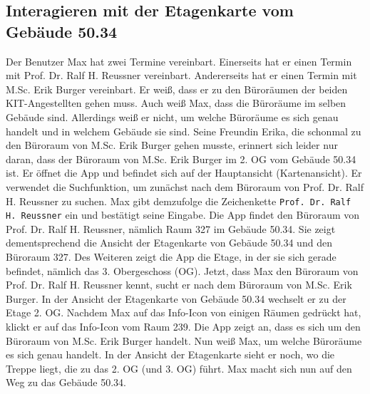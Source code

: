 \subsection{Interagieren mit der Etagenkarte vom Gebäude 50.34}

Der Benutzer Max hat zwei Termine vereinbart.
Einerseits hat er einen Termin mit Prof. Dr. Ralf H. Reussner vereinbart.
Andererseits hat er einen Termin mit M.Sc. Erik Burger vereinbart.
Er weiß, dass er zu den Büroräumen der beiden KIT-Angestellten gehen muss.
Auch weiß Max, dass die Büroräume im selben Gebäude sind.
Allerdings weiß er nicht, um welche Büroräume es sich genau handelt und in welchem Gebäude sie sind.
Seine Freundin Erika, die schonmal zu den Büroraum von M.Sc. Erik Burger gehen musste, erinnert sich leider nur daran, dass der Büroraum von M.Sc. Erik Burger im 2. OG vom Gebäude 50.34 ist.
Er öffnet die App und befindet sich auf der Hauptansicht (Kartenansicht).
Er verwendet die Suchfunktion, um zunächst nach dem Büroraum von Prof. Dr. Ralf H. Reussner zu suchen.
Max gibt demzufolge die Zeichenkette \texttt{Prof. Dr. Ralf H. Reussner} ein und bestätigt seine Eingabe.
Die App findet den Büroraum von Prof. Dr. Ralf H. Reussner, nämlich Raum 327 im Gebäude 50.34.
Sie zeigt dementsprechend die Ansicht der Etagenkarte von Gebäude 50.34 und den Büroraum 327.
Des Weiteren zeigt die App die Etage, in der sie sich gerade befindet, nämlich das 3. Obergeschoss (OG).
Jetzt, dass Max den Büroraum von Prof. Dr. Ralf H. Reussner kennt, sucht er nach dem Büroraum von M.Sc. Erik Burger.
In der Ansicht der Etagenkarte von Gebäude 50.34 wechselt er zu der Etage 2. OG.
Nachdem Max auf das Info-Icon von einigen Räumen gedrückt hat, klickt er auf das Info-Icon vom Raum 239.
Die App zeigt an, dass es sich um den Büroraum von M.Sc. Erik Burger handelt.
Nun weiß Max, um welche Büroräume es sich genau handelt.
In der Ansicht der Etagenkarte sieht er noch, wo die Treppe liegt, die zu das 2. OG (und 3. OG) führt.
Max macht sich nun auf den Weg zu das Gebäude 50.34.